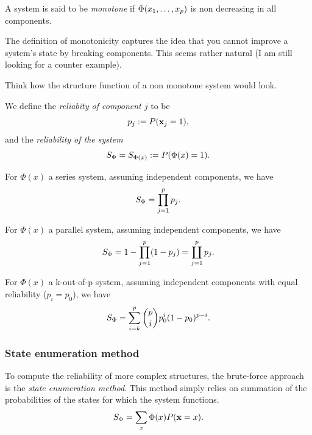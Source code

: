 \begin{definition}
A system is said to be \emph{monotone} if $\Phi(x_1,\dots,x_p)$ is non decreasing in all components.
\end{definition}
The definition of monotonicity captures the idea that you cannot improve a system's state by breaking components.
This seems rather natural (I am still looking for a counter example).


\begin{think}
	Think how the structure function of a non monotone system would look.
\end{think}




\begin{definition}[Reliability]
We define the \emph{reliabity of component $j$} to be $$p_j:= P(\mathbf{x}_j=1),$$ 
and  the \emph{reliability of the system} 
$$ S_\Phi = S_{\Phi(x)}:=P(\Phi(x)=1).$$
\end{definition}


\begin{example}
For $\Phi(x)$ a series system, assuming independent components, we have
$$ S_\Phi= \prod_{j=1}^{p} p_j.$$
\end{example}


\begin{example}
For $\Phi(x)$ a parallel system, assuming independent components, we have
$$ S_\Phi= 1-\prod_{j=1}^{p} (1-p_j)= \coprod_{j=1}^p p_j. $$
\end{example}


\begin{example}
For $\Phi(x)$ a k-out-of-p system, assuming independent components with equal reliability ($p_i=p_0$), we have
$$ S_\Phi= \sum_{i=k}^{p} \binom{p}{i} p_0^i (1-p_0)^{p-i} .$$
\end{example}



\subsubsection{State enumeration method}
To compute the reliability of more complex structures, the brute-force approach is the \emph{state enumeration method}. 
This method simply relies on summation of the probabilities of the states for which the system functions.
$$ S_\Phi= \sum_{x} \Phi(x) P(\mathbf{x}=x).$$


